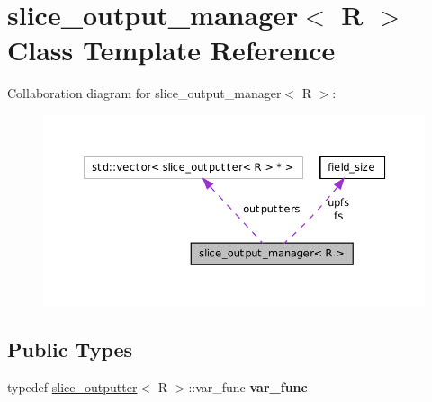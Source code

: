 \hypertarget{classslice__output__manager}{
\section{slice\_\-output\_\-manager$<$ R $>$ Class Template Reference}
\label{classslice__output__manager}
}


Collaboration diagram for slice\_\-output\_\-manager$<$ R $>$:
\nopagebreak
\begin{figure}[H]
\begin{center}
\leavevmode
\includegraphics[width=372pt]{classslice__output__manager__coll__graph}
\end{center}
\end{figure}
\subsection*{Public Types}
\begin{DoxyCompactItemize}
\item 
\hypertarget{classslice__output__manager_a52e08ac6e50f8f93dd50412350c03b1a}{
typedef \hyperlink{classslice__outputter}{slice\_\-outputter}$<$ R $>$::var\_\-func {\bfseries var\_\-func}}
\label{classslice__output__manager_a52e08ac6e50f8f93dd50412350c03b1a}

\end{DoxyCompactItemize}
